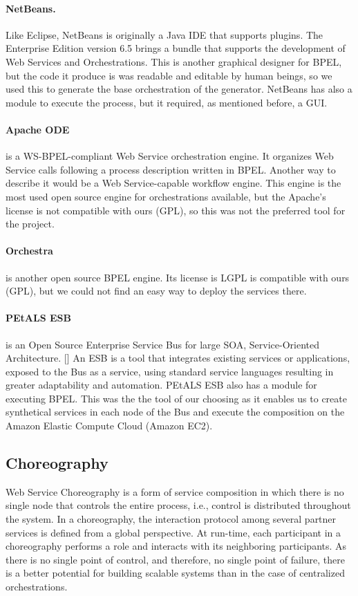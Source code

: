 \paragraph{NetBeans.}
Like Eclipse, NetBeans is originally a Java IDE that supports plugins. The Enterprise Edition version 6.5 brings a bundle that supports the development of Web Services and Orchestrations. This is another graphical designer for BPEL, but the code it produce is was readable and editable by human beings, so we used this to generate the base orchestration of the generator. NetBeans has also a module to execute the process, but it required, as mentioned before, a GUI.

\paragraph{Apache ODE}
is a WS-BPEL-compliant Web Service orchestration engine. It organizes Web Service calls following a process description written in BPEL. Another way to describe it would be a Web Service-capable workflow engine. This engine is the most used open source engine for orchestrations available, but the Apache's license is not compatible with ours (GPL), so this was not the preferred tool for the project.

\paragraph{Orchestra}
is another open source BPEL engine. Its license is LGPL is compatible with ours (GPL), but we could not find an easy way to deploy the services there.

\paragraph{PEtALS ESB}
is an Open Source Enterprise Service Bus for large SOA, Service-Oriented Architecture. [\citet{PEtALS}] An ESB is a tool that integrates existing services or applications, exposed to the Bus as a service, using standard service languages resulting in greater adaptability and automation. PEtALS ESB also has a module for executing BPEL. This was the the tool of our choosing as it enables us to create synthetical services in each node of the Bus and execute the composition on the Amazon Elastic Compute Cloud (Amazon EC2).


\subsection{Choreography}
Web Service Choreography is a form of service composition in which there is no single node that controls the entire process, i.e., control is distributed throughout the system. In a choreography, the interaction protocol among several partner services is defined from a global perspective. At run-time, each participant in a choreography performs a role and interacts with its neighboring participants. As there is no single point of control, and therefore, no single point of failure, there is a better potential for building scalable systems than in the case of centralized orchestrations.

